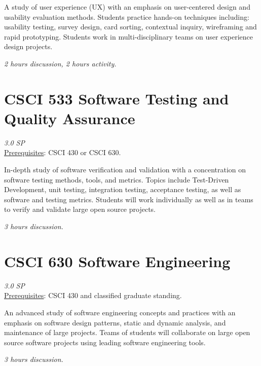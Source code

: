 \documentclass[12pt]{article}
\begin{document}
  A study of user experience (UX) with an emphasis on user-centered design and usability evaluation methods. Students practice hands-on techniques including: usability testing, survey design, card sorting, contextual inquiry, wireframing and rapid prototyping. Students work in multi-disciplinary teams on user experience design projects.

  \textit{2 hours discussion, 2 hours activity.}

  \section*{CSCI 533 Software Testing and Quality Assurance}
  \textit{3.0 SP} \\
  \underline{Prerequisites}: CSCI 430 or CSCI 630.

   In-depth study of software verification and validation with a concentration on software testing methods, tools, and metrics. Topics include Test-Driven Development, unit testing, integration testing, acceptance testing, as well as software and testing metrics. Students will work individually as well as in teams to verify and validate large open source projects.

  \textit{3 hours discussion.}

  \section*{CSCI 630 Software Engineering}
  \textit{3.0 SP} \\
  \underline{Prerequisites}: CSCI 430 and classified graduate standing.

   An advanced study of software engineering concepts and practices with an emphasis on software design patterns, static and dynamic analysis, and maintenance of large projects. Teams of students will collaborate on large open source software projects using leading software engineering tools. 

   \textit{3 hours discussion.}
  
\end{document}
